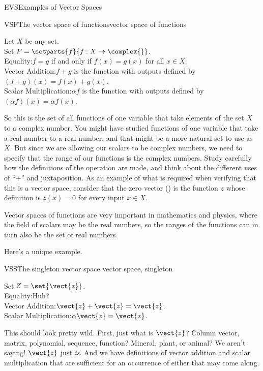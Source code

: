 \begin{subsect}{EVS}{Examples of Vector Spaces}
%
\begin{example}{VSF}{The vector space of functions}{vector space of functions}
\begin{para}Let $X$ be any set.\\
Set:\quad $F=\setparts{f}{f:X\rightarrow\complex{\null}}$.\\
Equality:\quad $f=g$ if and only if $f(x)=g(x)$ for all $x\in X$.\\
Vector Addition:\quad  $f+g$ is the function with outputs defined by $(f+g)(x)=f(x)+g(x)$.\\
Scalar Multiplication:\quad $\alpha f$ is the function with outputs defined by $(\alpha f)(x)=\alpha f(x)$.\end{para}
%
\begin{para}So this is the set of all functions of one variable that take elements of the set $X$ to a complex number.  You might have studied functions of one variable that take a real number to a real number, and that might be a more natural set to use as $X$.  But since we are allowing our scalars to be complex numbers, we need to specify that the range of our functions is the complex numbers.  Study carefully how the definitions of the operation are made, and think about the different uses of ``+'' and juxtaposition.  As an example of what is required when verifying that this is a vector space, consider that  the zero vector () is the function $z$ whose definition is $z(x)=0$ for every input $x\in X$.\end{para}
%
\begin{para}Vector spaces of functions are very important in mathematics and physics, where the field of scalars may be the real numbers, so the ranges of the functions can in turn also be the set of real numbers.\end{para}
%
\end{example}
%
\begin{para}Here's a unique example.\end{para}
%
\begin{example}{VSS}{The singleton vector space }{vector space, singleton}
\begin{para}Set:\quad $Z=\set{\vect{z}}$.\\
Equality:\quad Huh?\\
Vector Addition:\quad  $\vect{z}+\vect{z}=\vect{z}$.\\
Scalar Multiplication:\quad $\alpha\vect{z}=\vect{z}$.\end{para}
%
\begin{para}This should look pretty wild.  First, just what is $\vect{z}$?  Column vector, matrix, polynomial, sequence, function?  Mineral, plant, or animal?  We aren't saying!  $\vect{z}$ just {\em is}.  And we have definitions of vector addition and scalar multiplication that are sufficient for an occurrence of either that may come along.\end{para}

\end{example}
\end{subsect}
